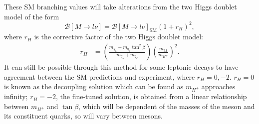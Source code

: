 \documentclass[a4paper,12pt]{article}
\begin{document}
These SM branching values will take alterations from the two Higgs doublet model of the form
\begin{equation}
    \label{eq:mesrh}
    \mathcal{B}[M\to l\nu] = \mathcal{B}[M\to l\nu]_{\text{SM}}(1+r_H)^2,
\end{equation}
where $r_H$ is the corrective factor of the two Higgs doublet model:
\begin{align}
    \label{eq:rh}
    r_H &= \left(\frac{m_{q_u}-m_{q_d}\tan^2\beta}{m_{q_u}+m_{q_d}}\right)\left(\frac{m_M}{m_{H^+}}\right)^2.
\end{align}
It can still be possible through this method for some leptonic decays to have agreement between the SM predictions and experiment, where $r_H = 0,-2$.
$r_H=0$ is known as the decoupling solution which can be found as $m_{H^+}$ approaches infinity; $r_H=-2$, the fine-tuned solution, is obtained from a linear relationship between $m_{H^+}$ and $\tan\beta$, which will be dependent of the masses of the meson and its constituent quarks, so will vary between mesons. 
\end{document}
